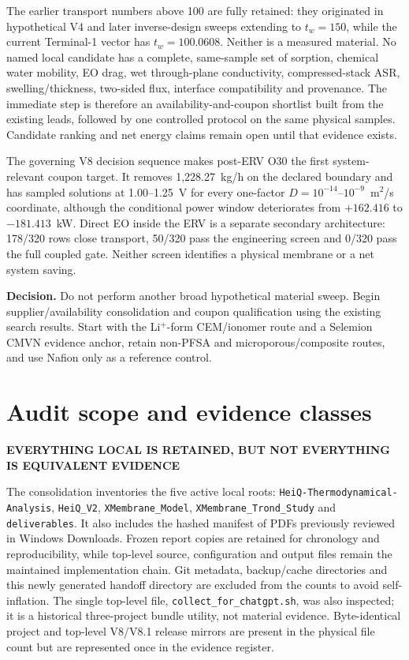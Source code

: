 \documentclass[10pt,a4paper]{article}
\newcommand{\eyebrow}[1]{{\sffamily\bfseries\small\color{Teal}\MakeUppercase{#1}}}
\begin{document}
The earlier transport numbers above 100 are fully retained: they originated
in hypothetical V4 and later inverse-design sweeps extending to
$t_w=150$, while the current Terminal-1 vector has $t_w=100.0608$.
Neither is a measured material. No named local candidate has a complete,
same-sample set of sorption, chemical water mobility, EO drag, wet
through-plane conductivity, compressed-stack ASR, swelling/thickness,
two-sided flux, interface compatibility and provenance. The immediate step is
therefore an availability-and-coupon shortlist built from the existing leads,
followed by one controlled protocol on the same physical samples. Candidate
ranking and net energy claims remain open until that evidence exists.

The governing V8 decision sequence makes post-ERV O30 the first
system-relevant coupon target. It removes 1,228.27~kg/h on the declared
boundary and has sampled solutions at 1.00--1.25~V for every one-factor
$D=10^{-14}$--$10^{-9}$~m$^2$/s coordinate, although the conditional power
window deteriorates from $+162.416$ to $-181.413$~kW. Direct EO inside the ERV
is a separate secondary architecture: 178/320 rows close transport, 50/320
pass the engineering screen and 0/320 pass the full coupled gate. Neither
screen identifies a physical membrane or a net system saving.

\begin{mainbox}
\textbf{Decision.} Do not perform another broad hypothetical material sweep.
Begin supplier/availability consolidation and coupon qualification using the
existing search results. Start with the Li$^+$-form CEM/ionomer route and a
Selemion CMVN evidence anchor, retain non-PFSA and microporous/composite routes,
and use Nafion only as a reference control.
\end{mainbox}

\section{Audit scope and evidence classes}
\eyebrow{Everything local is retained, but not everything is equivalent evidence}

The consolidation inventories the five active local roots:
\texttt{HeiQ-Thermodynamical-Analysis}, \texttt{HeiQ\_V2},
\texttt{XMembrane\_Model}, \texttt{XMembrane\_Trond\_Study} and
\texttt{deliverables}. It also includes the hashed manifest of PDFs previously
reviewed in Windows Downloads. Frozen report copies are retained for
chronology and reproducibility, while top-level source, configuration and
output files remain the maintained implementation chain. Git metadata,
backup/cache directories and this newly generated handoff directory are
excluded from the counts to avoid self-inflation. The single top-level file,
\texttt{collect\_for\_chatgpt.sh}, was also inspected; it is a historical
three-project bundle utility, not material evidence. Byte-identical project
and top-level V8/V8.1 release mirrors are present in the physical file count
but are represented once in the evidence register.
\end{document}
